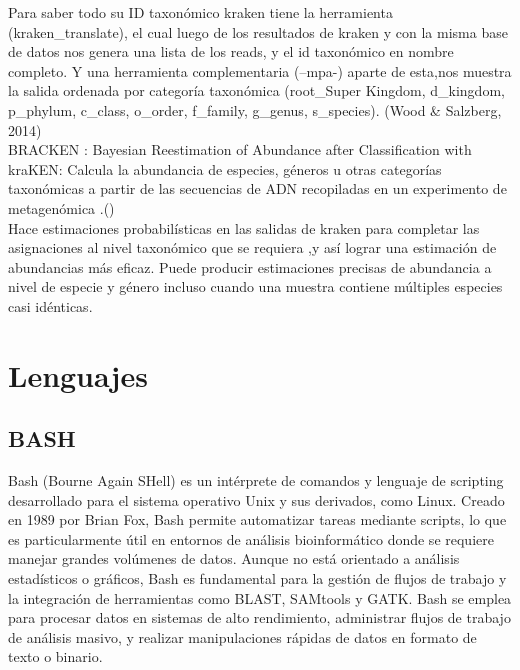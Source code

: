 Para saber todo su ID taxonómico kraken tiene la herramienta (kraken\_translate), el cual luego de los resultados de kraken y con la misma base de datos nos genera una lista de los reads, y el id taxonómico en nombre completo. Y una herramienta complementaria (--mpa-) aparte de esta,nos muestra la salida ordenada por categoría taxonómica (root\_Super Kingdom, d\_kingdom, p\_phylum, c\_class, o\_order, f\_family, g\_genus, s\_species). (Wood \& Salzberg, 2014)  \\



BRACKEN : Bayesian Reestimation of Abundance after Classification with kraKEN: Calcula la abundancia de especies, géneros u otras categorías taxonómicas a partir de las secuencias de ADN recopiladas en un experimento de metagenómica .(\cite{lu2017bracken})  \\

Hace estimaciones probabilísticas en las salidas de kraken para completar las asignaciones al nivel taxonómico que se requiera ,y así lograr una estimación de abundancias más eficaz. Puede producir estimaciones precisas de abundancia a nivel de especie y género incluso cuando una muestra contiene múltiples especies casi idénticas.   \\

\section{Lenguajes}

\subsection{BASH}
Bash (Bourne Again SHell) es un intérprete de comandos y lenguaje de scripting desarrollado para el sistema operativo Unix y sus derivados, como Linux. Creado en 1989 por Brian Fox, Bash permite automatizar tareas mediante scripts, lo que es particularmente útil en entornos de análisis bioinformático donde se requiere manejar grandes volúmenes de datos. Aunque no está orientado a análisis estadísticos o gráficos, Bash es fundamental para la gestión de flujos de trabajo y la integración de herramientas como BLAST, SAMtools y GATK. Bash se emplea para procesar datos en sistemas de alto rendimiento, administrar flujos de trabajo de análisis masivo, y realizar manipulaciones rápidas de datos en formato de texto o binario.\\

